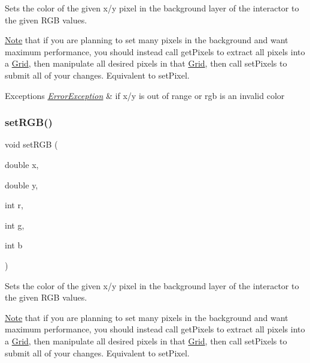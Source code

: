 Sets the color of the given x/y pixel in the background layer of the interactor to the given R\+GB values. 

\mbox{\hyperlink{classNote}{Note}} that if you are planning to set many pixels in the background and want maximum performance, you should instead call get\+Pixels to extract all pixels into a \mbox{\hyperlink{classGrid}{Grid}}, then manipulate all desired pixels in that \mbox{\hyperlink{classGrid}{Grid}}, then call set\+Pixels to submit all of your changes. Equivalent to set\+Pixel.


\begin{DoxyExceptions}{Exceptions}
{\em \mbox{\hyperlink{classErrorException}{Error\+Exception}}} & if x/y is out of range or rgb is an invalid color \\
\hline
\end{DoxyExceptions}
\mbox{\label{classGDrawingSurface_a81202471d4fc9f2015aef0bc073acfab}} 
\subsubsection{\texorpdfstring{set\+R\+G\+B()}{setRGB()}\hspace{0.1cm}{\footnotesize\ttfamily [2/3]}}
{\footnotesize\ttfamily void set\+R\+GB (\begin{DoxyParamCaption}\item[{double}]{x,  }\item[{double}]{y,  }\item[{int}]{r,  }\item[{int}]{g,  }\item[{int}]{b }\end{DoxyParamCaption})\hspace{0.3cm}{\ttfamily [virtual]}}



Sets the color of the given x/y pixel in the background layer of the interactor to the given R\+GB values. 

\mbox{\hyperlink{classNote}{Note}} that if you are planning to set many pixels in the background and want maximum performance, you should instead call get\+Pixels to extract all pixels into a \mbox{\hyperlink{classGrid}{Grid}}, then manipulate all desired pixels in that \mbox{\hyperlink{classGrid}{Grid}}, then call set\+Pixels to submit all of your changes. Equivalent to set\+Pixel.


